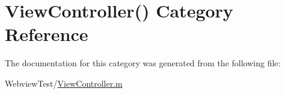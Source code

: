 \hypertarget{category_view_controller_07_08}{\section{View\-Controller() Category Reference}
\label{category_view_controller_07_08}
}


The documentation for this category was generated from the following file\-:\begin{DoxyCompactItemize}
\item 
Webview\-Test/\hyperlink{_view_controller_8m}{View\-Controller.\-m}\end{DoxyCompactItemize}
